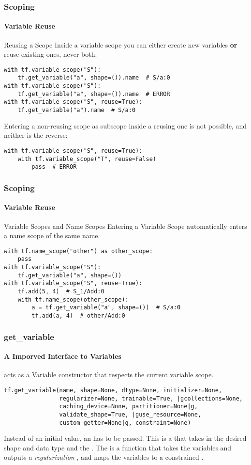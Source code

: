 \begin{frame}[fragile]
    \frametitle{Scoping}
    \framesubtitle{Variable Reuse}
    \begin{block}{Reusing a Scope}
        Inside a variable scope you can either create new variables \textbf{or} reuse existing ones, never both:
\begin{lstlisting}
with tf.variable_scope("S"):
    tf.get_variable("a", shape=()).name  # S/a:0
with tf.variable_scope("S"):
    tf.get_variable("a", shape=()).name  # ERROR
with tf.variable_scope("S", reuse=True):
    tf.get_variable("a").name  # S/a:0
\end{lstlisting}
Entering a non-reusing scope as subscope inside a reusing one is not possible, and neither is the reverse:
    \begin{lstlisting}
with tf.variable_scope("S", reuse=True):
    with tf.variable_scope("T", reuse=False)
        pass  # ERROR
\end{lstlisting}
    \end{block}
\end{frame}

\begin{frame}[fragile]
    \frametitle{Scoping}
    \framesubtitle{Variable Reuse}
    \begin{block}{Variable Scopes and Name Scopes}
        Entering a Variable Scope automatically enters a name scope of the same name.
\begin{lstlisting}
with tf.name_scope("other") as other_scope:
    pass
with tf.variable_scope("S"):
    tf.get_variable("a", shape=())
with tf.variable_scope("S", reuse=True):
    tf.add(5, 4)  # S_1/Add:0
    with tf.name_scope(other_scope):
        a = tf.get_variable("a", shape=())  # S/a:0
        tf.add(a, 4)  # other/Add:0
\end{lstlisting}
    \end{block}
\end{frame}

\begin{frame}[fragile]
    \frametitle{get\_variable}
    \framesubtitle{A Imporved Interface to Variables}
     acts as a Variable constructor that respects the current variable scope.
\begin{lstlisting}
tf.get_variable(name, shape=None, dtype=None, initializer=None, 
                regularizer=None, trainable=True, |gcollections=None, 
                caching_device=None, partitioner=None|g, 
                validate_shape=True, |guse_resource=None, 
                custom_getter=None|g, constraint=None)
\end{lstlisting}
    Instead of an initial value, an  has to be passed. 
    This is a  that takes in the desired shape and data type
    and  the . The 
    is a function that takes the variables  and outputs a 
    \emph{regularization} , and  maps the 
    variables  to a constrained .
\end{frame}

